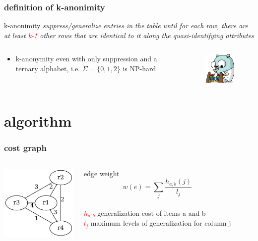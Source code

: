 \documentclass{beamer}
\begin{document}
\begin{frame}
  \frametitle{definition of k-anonimity}
  \begin{block}{k-anonimity}
    \textit{suppress/generalize entries in the table until for each row, there are at least \textcolor{red}{k-1} other rows that are identical to it along the quasi-identifying attributes}
  \end{block}
  \begin{columns}
    \begin{block}{}
      \begin{itemize}
        \item{k-anonymity even with only suppression and a ternary alphabet, i.e. \(\Sigma = \{0, 1, 2\}\) is NP-hard \cite{aggarwal} }
      \end{itemize}
    \end{block}
    \begin{figure}
      \includegraphics[width=100px]{../images/gopher-calc.png}
    \end{figure}
  \end{columns}
\end{frame}


\section{algorithm}

\begin{frame}
  \frametitle{cost graph}
  \begin{columns}
    \includegraphics[width=140px]{../graphs/cost-graph.png}
    \begin{block}{edge weight}
      $$w(e)=\sum_{j}^{} \frac{h_{a,b}(j)}{l_{j}}$$ \\
      \scriptsize{
	\textcolor{red}{ \(h_{a,b}\) } generalization cost of items a and b \\
	\textcolor{red}{ \(l_{j}\) } maximum levels of generalization for column j
      }
    \end{block}
  \end{columns}
\end{frame}
\end{document}
